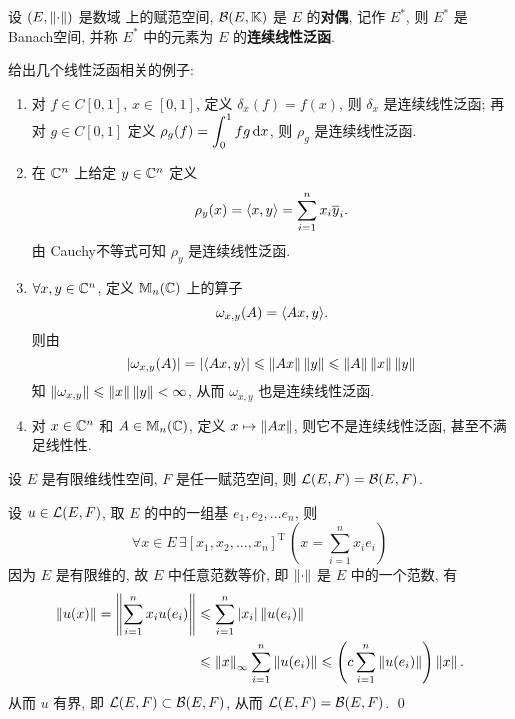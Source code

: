	\begin{Definition}[线性泛函]\label{def:线性泛函}
		 设 $ (E, \left\| \cdot \right\|) $ 是数域 \K 上的赋范空间,  $ \mathcal{B}(E, \mathbb{K}) $ 是 $ E $ 的\textbf{对偶}, 记作 $ E^{*} $, 则 $ E^{*} $ 是Banach空间, 并称 $ E^{*} $ 中的元素为 $ E $ 的\textbf{连续线性泛函}.
	\end{Definition}
	\begin{Example}
		给出几个线性泛函相关的例子:
		\begin{enumerate}[(1)]
			\item  对 $ f\in C[0, 1] $, $ x\in [0, 1] $, 定义 $ \delta_{x}(f)=f(x) $, 则 $ \delta_{x} $ 是连续线性泛函; 再对 $ g\in C[0, 1] $ 定义 $ \rho_{g}(f)=\displaystyle\int_{0}^{1}fg\,\mathrm{d} x $, 则 $ \rho_{g} $ 是连续线性泛函.
			\item 在 $ \mathbb{C}^{n} $ 上给定 $ y\in\mathbb{C}^{n} $ 定义 
			 \[
				\rho_{y}(x)=\langle x, y \rangle=\sum_{i=1}^{n}x_{i}\overline{y}_{i}.
			\]
			由 Cauchy不等式可知 $ \rho_{y} $ 是连续线性泛函.
			\item $ \forall x, y\in \mathbb{C}^{n} $, 定义 $ \mathbb{M}_{n}(\mathbb{C}) $ 上的算子
			\[
				\omega_{x, y}(A)=\langle Ax, y \rangle.
			\]
			则由
			\[
				\left| \omega_{x, y}(A) \right| =\left| \langle Ax, y \rangle \right| \leqslant\left\| Ax \right\|\left\| y \right\|\leqslant\left\| A \right\|\left\| x \right\|\left\| y \right\|
			\]
			知 $ \left\| \omega_{x, y} \right\|\leqslant\left\| x \right\|\left\| y \right\|<\infty $, 从而 $ \omega_{x, y} $ 也是连续线性泛函.
			\item 对 $ x\in\mathbb{C}^{n} $ 和 $ A\in\mathbb{M}_{n}(\mathbb{C}) $, 定义 $ x\mapsto \left\| Ax \right\| $, 则它不是连续线性泛函, 甚至不满足线性性.
		\end{enumerate}
	\end{Example}

	\begin{Theorem}
		 设 $ E $ 是有限维线性空间,  $ F $ 是任一赋范空间, 则 $ \mathcal{L}(E, F)=\mathcal{B}(E, F) $.  
	\end{Theorem}
	\begin{Proof}
		设 $ u\in\mathcal{L}(E, F) $, 取 $ E $ 的中的一组基 $ e_{1}, e_{2}, \dots e_{n} $, 则
		\[
			\forall x\in E\,\exists[x_{1}, x_{2}, \dots, x_{n}]^{\mathrm T}\,\left(x=\sum_{i=1}^{n}x_{i}e_{i}\right)
		\]
		因为 $ E $ 是有限维的, 故 $ E $ 中任意范数等价, 即 $ \left\| \cdot \right\| $ 是 $ E $ 中的一个范数, 有
		\[
			\begin{aligned}
				\left\| u(x) \right\|=\left\| \sum_{i=1}^{n}x_{i}u(e_{i}) \right\| & \leqslant \sum_{i=1}^{n}\left| x_{i} \right| \left\| u(e_{i}) \right\|\\
				& \leqslant\left\| x \right\|_{\infty}\sum_{i=1}^{n}\left\| u(e_{i}) \right\|\leqslant\left( c\sum_{i=1}^{n}\left\| u(e_{i}) \right\| \right)\left\| x \right\|.
			\end{aligned}
		\]
		从而 $ u $ 有界, 即 $ \mathcal{L}(E, F)\subset\mathcal{B}(E, F) $, 从而 $ \mathcal{L}(E, F)=\mathcal{B}(E, F) $. \qed
	\end{Proof}
	
